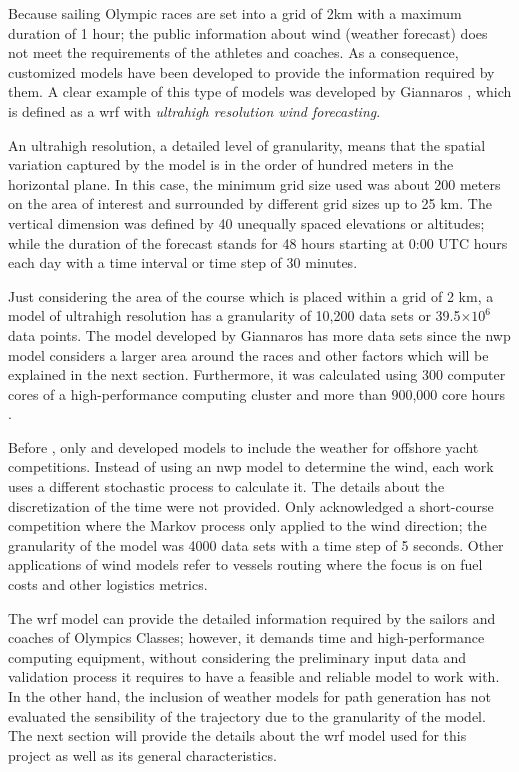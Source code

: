Because sailing Olympic races are set into a grid of 2km with a maximum duration of 1 hour; the public information about wind (weather forecast) does not meet the requirements of the athletes and coaches. As a consequence, customized models have been developed to provide the information required by them. A clear example of this type of models was developed by Giannaros \cite{giannaros2018ultrahigh}, which is defined as a \acrshort{wrf} with \textit{ultrahigh resolution wind forecasting}.\par 

An ultrahigh resolution, a detailed level of granularity, means that the spatial variation captured by the model is in the order of hundred meters in the horizontal plane. In this case, the minimum grid size used was about 200 meters on the area of interest and surrounded by different grid sizes up to 25 km. The vertical dimension was defined by 40 unequally spaced elevations or altitudes; while the duration of the forecast stands for 48 hours starting at 0:00 UTC hours each day with a time interval or time step of 30 minutes. \par \noindent 

Just considering the area of the course which is placed within a grid of 2 km, a model of ultrahigh resolution has a granularity of 10,200 data sets or 39.5$\times 10^6$ data points. The model developed by Giannaros has more data sets since the \acrshort{nwp} model considers a larger area around the races and other factors which will be explained in the next section. Furthermore, it was calculated using 300 computer cores of a high-performance computing cluster and more than 900,000 core hours \cite{giannaros2018ultrahigh}. 

Before \cite{giannaros2018ultrahigh}, only \cite{philpott2001optimising} and \cite{allsopp2000optimal} developed models to include the weather for offshore yacht competitions. Instead of using an \acrshort{nwp} model to determine the wind, each work uses a different stochastic process to calculate it. The details about the discretization of the time were not provided. Only \cite{philpott2001optimising} acknowledged a short-course competition where the Markov process only applied to the wind direction; the granularity of the model was 4000 data sets with a time step of 5 seconds. Other applications of wind models refer to vessels routing where the focus is on fuel costs and other logistics metrics. \par 

The \acrshort{wrf} model can provide the detailed information required by the sailors and coaches of Olympics Classes; however, it demands time and high-performance computing equipment, without considering the preliminary input data and validation process it requires to have a feasible and reliable model to work with. In the other hand, the inclusion of weather models for path generation has not evaluated the sensibility of the trajectory due to the granularity of the model. The next section will provide the details about the \acrshort{wrf} model used for this project as well as its general characteristics. \par 

